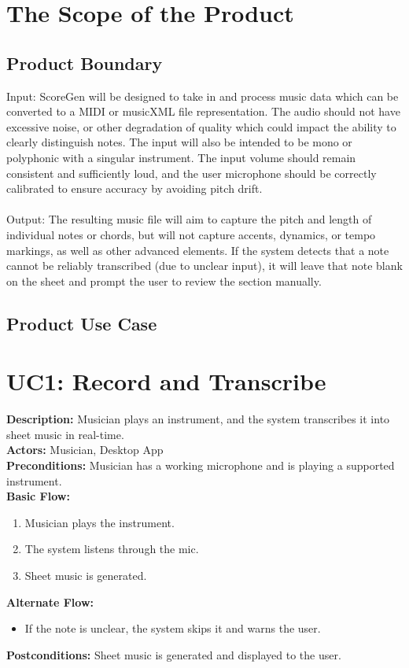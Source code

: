 \documentclass[12pt]{article}
\begin{document}
\section{The Scope of the Product}
\subsection{Product Boundary}
Input: ScoreGen will be designed to take in and process music data which can be converted to a MIDI or musicXML file representation. The audio should not have excessive noise, or other degradation of quality which could impact the ability to clearly distinguish notes. The input will also be intended to be mono or polyphonic with a singular instrument. The input volume should remain consistent and sufficiently loud, and the user microphone should be correctly calibrated to ensure accuracy by avoiding pitch drift.
\\ \\
Output: The resulting music file will aim to capture the pitch and length of individual notes or chords, but will not capture accents, dynamics, or tempo markings, as well as other advanced elements. If the system detects that a note cannot be reliably transcribed (due to unclear input), it will leave that note blank on the sheet and prompt the user to review the section manually.
\subsection{Product Use Case}
\section*{UC1: Record and Transcribe}
\textbf{Description:} Musician plays an instrument, and the system transcribes it into sheet music in real-time. \\
\textbf{Actors:} Musician, Desktop App \\
\textbf{Preconditions:} Musician has a working microphone and is playing a supported instrument. \\
\textbf{Basic Flow:}
\begin{enumerate}
    \item Musician plays the instrument.
    \item The system listens through the mic.
    \item Sheet music is generated.
\end{enumerate}
\textbf{Alternate Flow:}
\begin{itemize}
    \item If the note is unclear, the system skips it and warns the user.
\end{itemize}
\textbf{Postconditions:} Sheet music is generated and displayed to the user. 
\end{document}
